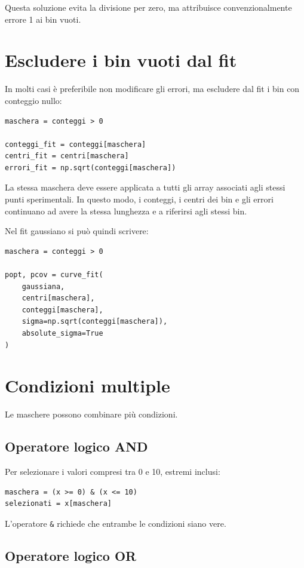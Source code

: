 \documentclass[11pt,a4paper]{book}
\begin{document}
Questa soluzione evita la divisione per zero, ma attribuisce convenzionalmente errore 1 ai bin vuoti.

\section{Escludere i bin vuoti dal fit}

In molti casi è preferibile non modificare gli errori, ma escludere dal fit i bin con conteggio nullo:

\begin{lstlisting}
maschera = conteggi > 0

conteggi_fit = conteggi[maschera]
centri_fit = centri[maschera]
errori_fit = np.sqrt(conteggi[maschera])
\end{lstlisting}

La stessa maschera deve essere applicata a tutti gli array associati agli stessi punti sperimentali. In questo modo, i conteggi, i centri dei bin e gli errori continuano ad avere la stessa lunghezza e a riferirsi agli stessi bin.

Nel fit gaussiano si può quindi scrivere:

\begin{lstlisting}
maschera = conteggi > 0

popt, pcov = curve_fit(
    gaussiana,
    centri[maschera],
    conteggi[maschera],
    sigma=np.sqrt(conteggi[maschera]),
    absolute_sigma=True
)
\end{lstlisting}

\section{Condizioni multiple}

Le maschere possono combinare più condizioni.

\subsection{Operatore logico AND}

Per selezionare i valori compresi tra 0 e 10, estremi inclusi:

\begin{lstlisting}
maschera = (x >= 0) & (x <= 10)
selezionati = x[maschera]
\end{lstlisting}

L'operatore \texttt{\&} richiede che entrambe le condizioni siano vere.

\subsection{Operatore logico OR}
\end{document}
